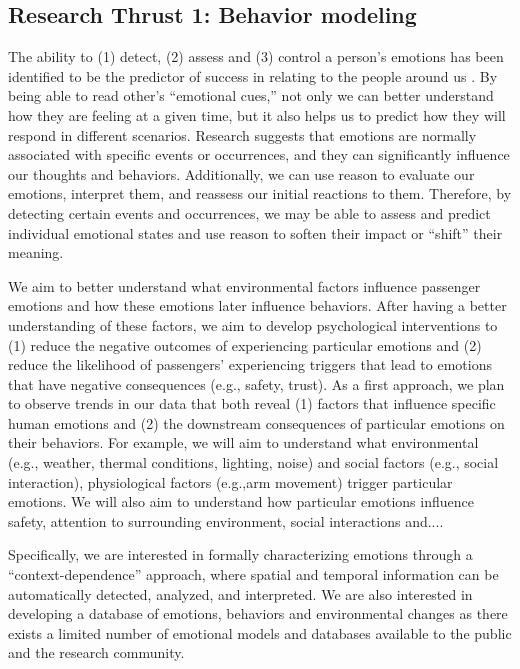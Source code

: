 \subsection{Research Thrust 1: Behavior modeling}
\label{sec:behaviour}

 The ability to (1) detect, (2) assess and (3) control a person’s emotions has been identified to be the predictor of success in relating to the people around us . By being able to read other’s “emotional cues,” not only we can better understand how they are feeling at a given time, but it also helps us to predict how they will respond in different scenarios. Research suggests that emotions are normally associated with specific events or occurrences, and they can significantly influence our thoughts and behaviors. Additionally, we can use reason to evaluate our emotions, interpret them, and reassess our initial reactions to them. Therefore, by detecting certain events and occurrences, we may be able to assess and predict individual emotional states and use reason to soften their impact or “shift” their meaning. 



We aim to better understand what environmental factors influence passenger emotions and how these emotions later influence behaviors.  After having a better understanding of these factors, we aim to develop psychological interventions to (1) reduce the negative outcomes of experiencing particular emotions  and (2) reduce the likelihood of passengers’ experiencing triggers that lead to emotions that have negative consequences (e.g., safety, trust). 
As a first approach, we plan to observe trends in our data that both reveal (1) factors that influence specific human emotions and (2) the downstream consequences of particular emotions on their behaviors. For example, we will aim to understand what environmental (e.g., weather, thermal conditions, lighting, noise) and social factors (e.g., social interaction), physiological factors (e.g.,arm movement) trigger particular emotions. We will also aim to understand how particular emotions influence safety, attention to surrounding environment, social interactions and.... 

Specifically, we are interested in formally characterizing emotions through a “context-dependence” approach, where spatial and temporal information can be automatically detected, analyzed, and interpreted. We are also interested in developing a database of  emotions, behaviors and environmental changes as there exists a limited number of emotional models and databases available to the public and the research community.

